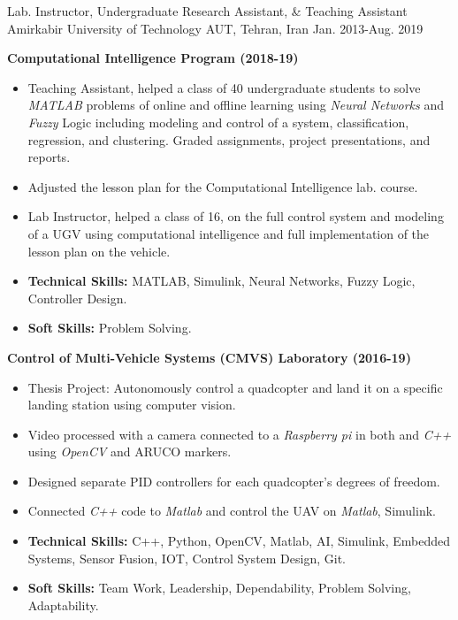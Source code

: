 \begin{cventries}
\cventry
{Lab. Instructor, Undergraduate Research Assistant, \& Teaching Assistant}
{Amirkabir University of Technology}
{AUT, Tehran, Iran}
{Jan. 2013-Aug. 2019}
{
    \begin{cvitems}
    \item{\textbf{Computational Intelligence Program (2018-19)}}
      \begin{itemize}[label= - ] %
        \item{Teaching Assistant, helped a class of 40 undergraduate students to solve \textit{MATLAB} problems of online and offline learning using \textit{Neural Networks} and \textit{Fuzzy} Logic including modeling and control of a system, classification, regression, and clustering. Graded assignments, project presentations, and reports.}
        \item{Adjusted the lesson plan for the Computational Intelligence lab. course.}
        \item{Lab Instructor, helped a class of 16, on the full control system and modeling of a UGV using computational intelligence and full implementation of the lesson plan on the vehicle.}
        \item {\textbf{Technical Skills:} MATLAB, Simulink, Neural Networks, Fuzzy Logic, Controller Design.}
        \item {\textbf{Soft Skills:} Problem Solving.}
      \end{itemize}
      \item{\textbf{Control of Multi-Vehicle Systems (CMVS) Laboratory (2016-19)}}
      \begin{itemize}[label= - ] %
        \item{Thesis Project: Autonomously control a quadcopter and land it on a specific landing station using computer vision.}
          \item{Video processed with a camera connected to a \textit{Raspberry pi} in both  and \textit{C++ } using \textit{OpenCV} and ARUCO markers.}
          \item{Designed separate PID controllers for each quadcopter's degrees of freedom.}
          \item{Connected \textit{C++} code to \textit{Matlab} and control the UAV  on \textit{Matlab}, Simulink.}
        \item {\textbf{Technical Skills:} C++, Python, OpenCV, Matlab, AI, Simulink, Embedded Systems, Sensor Fusion, IOT, Control System Design, Git.}
        \item {\textbf{Soft Skills:} Team Work, Leadership, Dependability, Problem Solving, Adaptability.}

\end{itemize}
\end{cvitems}}
\end{cventries}
